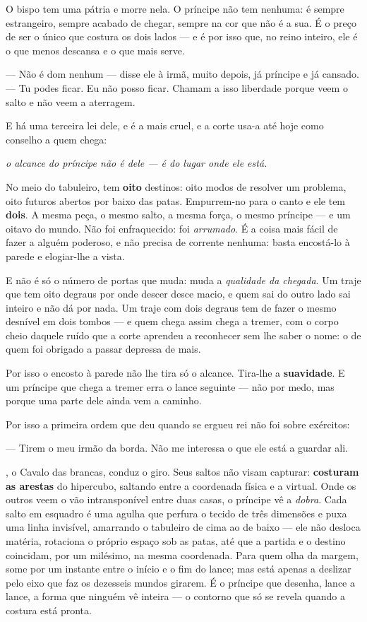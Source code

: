 \documentclass[livro.tex]{subfiles}
\begin{document}
O bispo tem uma pátria e morre nela. O príncipe não tem nenhuma: é sempre estrangeiro,
sempre acabado de chegar, sempre na cor que não é a sua. É o preço de ser o único que
costura os dois lados --- e é por isso que, no reino inteiro, ele é o que menos descansa
e o que mais serve.

--- Não é dom nenhum --- disse ele à irmã, muito depois, já príncipe e já cansado. --- Tu
podes ficar. Eu não posso ficar. Chamam a isso liberdade porque veem o salto e não veem a
aterragem.

\medskip

E há uma terceira lei dele, e é a mais cruel, e a corte usa-a até hoje como conselho a
quem chega:

\emph{o alcance do príncipe não é dele --- é do lugar onde ele está.}

No meio do tabuleiro, \Joa tem \textbf{oito} destinos: oito modos de resolver um problema,
oito futuros abertos por baixo das patas. Empurrem-no para o canto e ele tem
\textbf{dois}. A mesma peça, o mesmo salto, a mesma força, o mesmo príncipe --- e um
oitavo do mundo. Não foi enfraquecido: foi \emph{arrumado}. É a coisa mais fácil de fazer
a alguém poderoso, e não precisa de corrente nenhuma: basta encostá-lo à parede e
elogiar-lhe a vista.

E não é só o número de portas que muda: muda a \emph{qualidade da chegada}. Um traje que
tem oito degraus por onde descer desce macio, e quem sai do outro lado sai inteiro e não
dá por nada. Um traje com dois degraus tem de fazer o mesmo desnível em dois tombos ---
e quem chega assim chega a tremer, com o corpo cheio daquele ruído que a corte aprendeu a
reconhecer sem lhe saber o nome: o de quem foi obrigado a passar depressa de mais.

Por isso o encosto à parede não lhe tira só o alcance. Tira-lhe a \textbf{suavidade}. E um
príncipe que chega a tremer erra o lance seguinte --- não por medo, mas porque uma parte
dele ainda vem a caminho.

Por isso a primeira ordem que \Ben deu quando se ergueu rei não foi sobre exércitos:

--- Tirem o meu irmão da borda. Não me interessa o que ele está a guardar ali.

\medskip

\Joa , o Cavalo das brancas, conduz o giro. Seus saltos não visam capturar:
\textbf{costuram as arestas} do hipercubo, saltando entre a coordenada física e a
virtual. Onde os outros veem o vão intransponível entre duas casas, o príncipe vê a
\emph{dobra}. Cada salto em esquadro é uma agulha que perfura o tecido de três dimensões
e puxa uma linha invisível, amarrando o tabuleiro de cima ao de baixo --- ele não
desloca matéria, rotaciona o próprio espaço sob as patas, até que a partida e o destino
coincidam, por um milésimo, na mesma coordenada. Para quem olha da margem, some por um
instante entre o início e o fim do lance; mas está apenas a deslizar pelo eixo que faz
os dezesseis mundos girarem. É o príncipe que desenha, lance a lance, a forma que
ninguém vê inteira --- o contorno que só se revela quando a costura está pronta.
\end{document}

